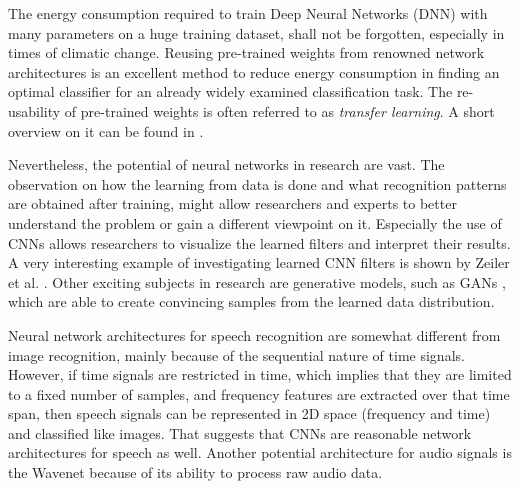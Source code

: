 The energy consumption required to train Deep Neural Networks (DNN) with many parameters on a huge training dataset, shall not be forgotten, especially in times of climatic change.
Reusing pre-trained weights from renowned network architectures is an excellent method to reduce energy consumption in finding an optimal classifier for an already widely examined classification task.
The re-usability of pre-trained weights is often referred to as \emph{transfer learning}.
A short overview on it can be found in \cite{TransferLearning}.

Nevertheless, the potential of neural networks in research are vast.
The observation on how the learning from data is done and what recognition patterns are obtained after training, might allow researchers and experts to better understand the problem or gain a different viewpoint on it.
Especially the use of CNNs allows researchers to visualize the learned filters and interpret their results.
A very interesting example of investigating learned CNN filters is shown by Zeiler et al. \cite{Zeiler2013}.
Other exciting subjects in research are generative models, such as GANs \cite{Goodfellow2014}, which are able to create convincing samples from the learned data distribution.

Neural network architectures for speech recognition are somewhat different from image recognition, mainly because of the sequential nature of time signals.
However, if time signals are restricted in time, which implies that they are limited to a fixed number of samples, and frequency features are extracted over that time span, then speech signals can be represented in 2D space (frequency and time) and classified like images.
That suggests that CNNs are reasonable network architectures for speech as well.
Another potential architecture for audio signals is the Wavenet \cite{Oord2016} because of its ability to process raw audio data.